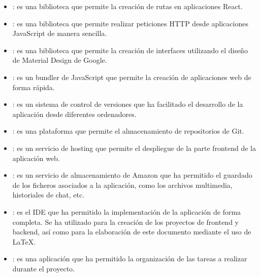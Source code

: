 \begin{itemize}
	\item {}: es una biblioteca que permite la creación de rutas en aplicaciones React.
	\item {}: es una biblioteca que permite realizar peticiones HTTP desde aplicaciones JavaScript de
	manera sencilla.
	\item {}: es una biblioteca que permite la creación de interfaces utilizando el diseño de
	Material Design de Google.
	\item {}: es un bundler de JavaScript que permite la creación de aplicaciones web de forma rápida.
	\item {}: es un sistema de control de versiones que ha facilitado el desarrollo de la aplicación desde
	diferentes ordenadores.
	\item {}: es una plataforma que permite el almacenamiento de repositorios de Git.
	\item {}: es un servicio de hosting que permite el despliegue de la parte frontend de la
	aplicación web.
	\item {}: es un servicio de almacenamiento de Amazon que ha permitido el guardado de los ficheros
	asociados a la aplicación, como los archivos multimedia, historiales de chat, etc.
	\item {}: es el IDE que ha permitido la implementación de la aplicación de forma completa.
	Se ha utilizado para la creación de los proyectos de frontend y backend, así como para la
	elaboración de este documento mediante el uso de \LaTeX.
	\item {}: es una aplicación que ha permitido la organización de las tareas a realizar durante el
	proyecto.
\end{itemize}
